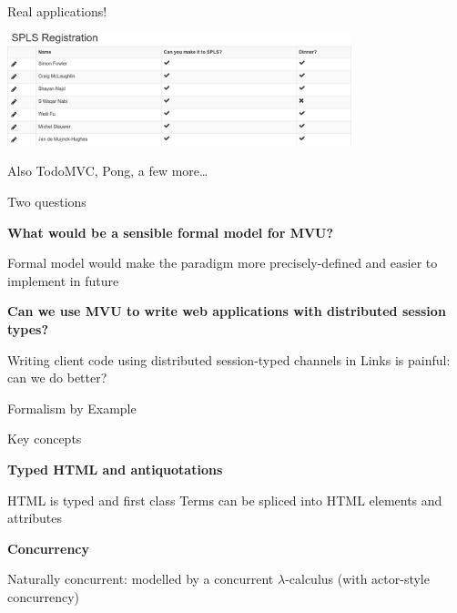 \documentclass[11.5pt, aspectratio=169]{beamer}
\begin{document}
\begin{frame}{Real applications!}

  \begin{center}
    \includegraphics[width=0.75\textwidth]{images/spls-reg.png}
  \end{center}

  \begin{itemize}
    \itemR Also TodoMVC, Pong, a few more\ldots
  \end{itemize}
\end{frame}


\begin{frame}{Two questions}
  \begin{fullpageitemize}
  \item {\Large \textbf{What would be a sensible formal model for MVU?}}
    \begin{itemize}
      \itemR Formal model would make the paradigm more precisely-defined and easier to implement in future
    \end{itemize}
    \vspace{1em}
  \item {\Large \textbf{Can we use MVU to write web applications with distributed session types?}}
    \begin{itemize}
      \itemR Writing client code using distributed session-typed channels in Links is painful: can we do better?
    \end{itemize}
  \end{fullpageitemize}
\end{frame}


\begin{frame}{Formalism by Example}

\end{frame}

\begin{frame}{Key concepts}

  \begin{fullpageitemize}
  \item {\Large \textbf{Typed HTML and antiquotations}}
    \begin{itemize}
      \itemR HTML is typed and first class
      \itemR Terms can be spliced into HTML elements and attributes
    \end{itemize}
    \vspace{1em}
  \item {\Large \textbf{Concurrency}}
    \begin{itemize}
      \itemR Naturally concurrent: modelled by a concurrent $\lambda$-calculus (with actor-style concurrency)
    \end{itemize}
  \end{fullpageitemize}
\end{frame}
\end{document}
